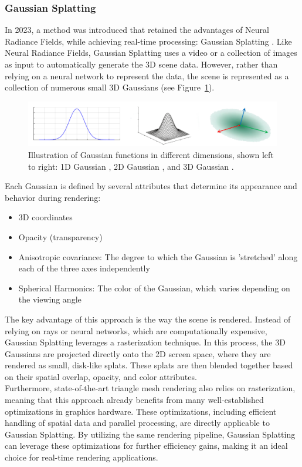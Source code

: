 \documentclass[12pt]{article}
\begin{document}
\subsubsection{Gaussian Splatting}
In 2023, a method was introduced that retained the advantages of Neural Radiance Fields, while achieving real-time processing: Gaussian Splatting \parencite{OriginalSplatting}. Like Neural Radiance Fields, Gaussian Splatting uses a video or a collection of images as input to automatically generate the 3D scene data. However, rather than relying on a neural network to represent the data, the scene is represented as a collection of numerous small 3D Gaussians (see Figure~\ref{fig:Form}).
\begin{figure}[h!]
	\centering
	\includegraphics[width=\textwidth]{Images/GaussianForm.png}
	\caption{Illustration of Gaussian functions in different dimensions, shown left to right: 1D Gaussian \parencite{1DGaussian}, 2D Gaussian \parencite{2DGaussian}, and 3D Gaussian \parencite{3DGaussian}.}
	\label{fig:Form}
\end{figure}
\newpage  \noindent
Each Gaussian is defined by several attributes that determine its appearance and behavior during rendering:
\begin{itemize}
	\item 3D coordinates
	\item Opacity (transparency)
	\item Anisotropic covariance: The degree to which the Gaussian is 'stretched' along each of the three axes independently
	\item Spherical Harmonics: The color of the Gaussian, which varies depending on the viewing angle
\end{itemize}
The key advantage of this approach is the way the scene is rendered. Instead of relying on rays or neural networks, which are computationally expensive, Gaussian Splatting leverages a rasterization technique. In this process, the 3D Gaussians are projected directly onto the 2D screen space, where they are rendered as small, disk-like splats. These splats are then blended together based on their spatial overlap, opacity, and color attributes.\\
Furthermore, state-of-the-art triangle mesh rendering also relies on rasterization, meaning that this approach already benefits from many well-established optimizations in graphics hardware. These optimizations, including efficient handling of spatial data and parallel processing, are directly applicable to Gaussian Splatting. By utilizing the same rendering pipeline, Gaussian Splatting can leverage these optimizations for further efficiency gains, making it an ideal choice for real-time rendering applications.
\end{document}
